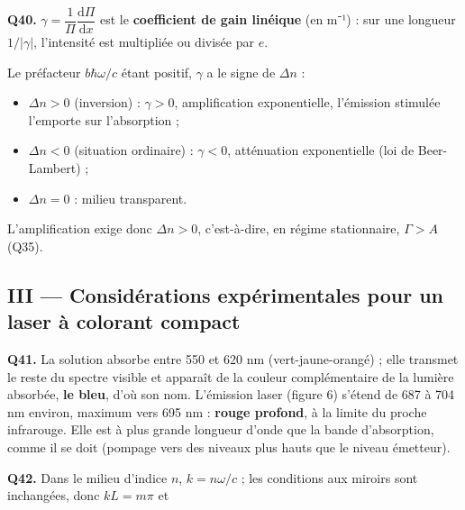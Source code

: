 \documentclass[11pt,a4paper]{article}
\providecommand{\tightlist}{\setlength{\itemsep}{0pt}\setlength{\parskip}{0pt}}
\newcommand{\equationajustee}[1]{%
  \sbox{\boiteequation}{$\displaystyle #1$}%
  \ifdim\wd\boiteequation>\linewidth
    \[\resizebox{\linewidth}{!}{\usebox{\boiteequation}}\]%
  \else
    \[#1\]%
  \fi}
\begin{document}
\textbf{Q40.} \(\gamma=\dfrac{1}{\Pi}\dfrac{\mathrm d\Pi}{\mathrm dx}\) est le \textbf{coefficient de gain linéique} (en m⁻¹) : sur une longueur \(1/\lvert\gamma\rvert\), l'intensité est multipliée ou divisée par \(e\).

Le préfacteur \(b\hbar\omega/c\) étant positif, \(\gamma\) a le signe de \(\Delta n\) :

\begin{itemize}
\tightlist
\item
  \(\Delta n>0\) (inversion) : \(\gamma>0\), amplification exponentielle, l'émission stimulée l'emporte sur l'absorption ;
\item
  \(\Delta n<0\) (situation ordinaire) : \(\gamma<0\), atténuation exponentielle (loi de Beer-Lambert) ;
\item
  \(\Delta n=0\) : milieu transparent.
\end{itemize}

L'amplification exige donc \(\Delta n>0\), c'est-à-dire, en régime stationnaire, \(\Gamma>A\) (Q35).

\equationajustee{\boxed{\gamma>0\iff\Delta n>0\iff\Gamma>A}}

\hypertarget{iii-considuxe9rations-expuxe9rimentales-pour-un-laser-uxe0-colorant-compact}{%
\subsection{III --- Considérations expérimentales pour un laser à colorant compact}\label{iii-considuxe9rations-expuxe9rimentales-pour-un-laser-uxe0-colorant-compact}}

\textbf{Q41.} La solution absorbe entre 550 et 620 nm (vert-jaune-orangé) ; elle transmet le reste du spectre visible et apparaît de la couleur complémentaire de la lumière absorbée, \textbf{le bleu}, d'où son nom. L'émission laser (figure 6) s'étend de 687 à 704 nm environ, maximum vers 695 nm : \textbf{rouge profond}, à la limite du proche infrarouge. Elle est à plus grande longueur d'onde que la bande d'absorption, comme il se doit (pompage vers des niveaux plus hauts que le niveau émetteur).

\textbf{Q42.} Dans le milieu d'indice \(n\), \(k=n\omega/c\) ; les conditions aux miroirs sont inchangées, donc \(kL=m\pi\) et

\equationajustee{\begin{aligned}
\nu_m&=m\frac{c}{2nL}\\
{\mathrm{FSR}}_\nu&=\frac{c}{2nL}
\end{aligned}}
\end{document}
